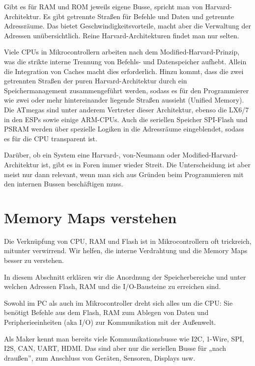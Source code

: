 Gibt es für RAM und ROM jeweils eigene Busse, spricht man von Harvard-Architektur. Es gibt getrennte Straßen für Befehle und Daten und getrennte Adressräume. Das bietet Geschwindigkeitsvorteile, macht aber die Verwaltung der Adressen unübersichtlich. Reine Harvard-Architekturen findet man nur selten.

Viele CPUs in Mikrocontrollern arbeiten nach dem Modified-Harvard-Prinzip, was die strikte interne Trennung von Befehls- und Datenspeicher aufhebt. Allein die Integration von Caches macht dies erforderlich. Hinzu kommt, dass die zwei getrennten Straßen der puren Harvard-Architektur durch ein Speichermanagement zusammengeführt werden, sodass es für den Programmierer wie zwei oder mehr hintereinander liegende Straßen aussieht (Unified Memory). Die ATmegas sind unter anderem Vertreter dieser Architektur, ebenso die LX6/7 in den ESPs sowie einige ARM-CPUs. Auch die seriellen Speicher SPI-Flash und PSRAM werden über spezielle Logiken in die Adressräume eingeblendet, sodass es für die CPU transparent ist.

Darüber, ob ein System eine Harvard-, von-Neumann oder Modified-Harvard-Architektur ist, gibt es in Foren immer wieder Streit. Die Unterscheidung ist aber meist nur dann relevant, wenn man sich aus Gründen beim Programmieren mit den internen Bussen beschäftigen muss.



\section{Memory Maps verstehen}

Die Verknüpfung von CPU, RAM und Flash ist in Mikrocontrollern oft trickreich, mitunter verwirrend. Wir helfen, die interne Verdrahtung und die Memory Maps besser zu verstehen.

In diesem Abschnitt erklären wir die Anordnung der Speicherbereiche und unter welchen Adressen Flash, RAM und die I/O-Bausteine zu erreichen sind.

Sowohl im PC als auch im Mikrocontroller dreht sich alles um die CPU: Sie benötigt Befehle aus dem Flash, RAM zum Ablegen von Daten und Peripherieeinheiten (aka I/O) zur Kommunikation mit der Außenwelt.

Als Maker kennt man bereits viele Kommunikationsbusse wie I2C, 1-Wire, SPI, I2S, CAN, UART, HDMI. Das sind aber nur die seriellen Busse für „nach draußen”, zum Anschluss von Geräten, Sensoren, Displays usw.


